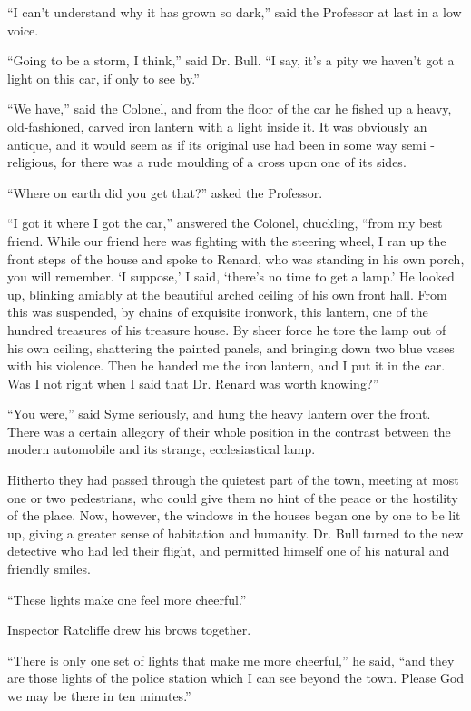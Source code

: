 \documentclass{book}
\begin{document}
“I can’t understand why it has grown so dark,” said the Professor at last in a low voice.

“Going to be a storm, I think,” said Dr. Bull. “I say, it’s a pity we haven’t got a light on this car, if only to see by.”

“We have,” said the Colonel, and from the floor of the car he fished up a heavy, old-fashioned, carved iron lantern with a light inside it. It was obviously an antique, and it would seem as if its original use had been in some way semi -religious, for there was a rude moulding of a cross upon one of its sides.

“Where on earth did you get that?” asked the Professor.

“I got it where I got the car,” answered the Colonel, chuckling, “from my best friend. While our friend here was fighting with the steering wheel, I ran up the front steps of the house and spoke to Renard, who was standing in his own porch, you will remember. ‘I suppose,’ I said, ‘there’s no time to get a lamp.’ He looked up, blinking amiably at the beautiful arched ceiling of his own front hall. From this was suspended, by chains of exquisite ironwork, this lantern, one of the hundred treasures of his treasure house. By sheer force he tore the lamp out of his own ceiling, shattering the painted panels, and bringing down two blue vases with his violence. Then he handed me the iron lantern, and I put it in the car. Was I not right when I said that Dr. Renard was worth knowing?”

“You were,” said Syme seriously, and hung the heavy lantern over the front. There was a certain allegory of their whole position in the contrast between the modern automobile and its strange, ecclesiastical lamp.

Hitherto they had passed through the quietest part of the town, meeting at most one or two pedestrians, who could give them no hint of the peace or the hostility of the place. Now, however, the windows in the houses began one by one to be lit up, giving a greater sense of habitation and humanity. Dr. Bull turned to the new detective who had led their flight, and permitted himself one of his natural and friendly smiles.

“These lights make one feel more cheerful.”

Inspector Ratcliffe drew his brows together.

“There is only one set of lights that make me more cheerful,” he said, “and they are those lights of the police station which I can see beyond the town. Please God we may be there in ten minutes.”
\end{document}
